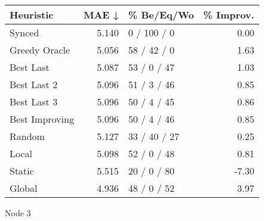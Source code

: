\begin{tabular}{lrlr}
\toprule
\textbf{Heuristic} & \textbf{MAE ↓} & \textbf{\% Be/Eq/Wo} & \textbf{\% Improv.} \\
\midrule
            Synced &          5.140 &          0 / 100 / 0 &                0.00 \\
     Greedy Oracle &          5.056 &          58 / 42 / 0 &                1.63 \\
         Best Last &          5.087 &          53 / 0 / 47 &                1.03 \\
       Best Last 2 &          5.096 &          51 / 3 / 46 &                0.85 \\
       Best Last 3 &          5.096 &          50 / 4 / 45 &                0.86 \\
    Best Improving &          5.096 &          50 / 4 / 46 &                0.85 \\
            Random &          5.127 &         33 / 40 / 27 &                0.25 \\
             Local &          5.098 &          52 / 0 / 48 &                0.81 \\
            Static &          5.515 &          20 / 0 / 80 &               -7.30 \\
            Global &          4.936 &          48 / 0 / 52 &                3.97 \\
\bottomrule
\end{tabular}
\caption{Node 3}
\label{tab:ds_iid_lr01_le2_bs2_3}
